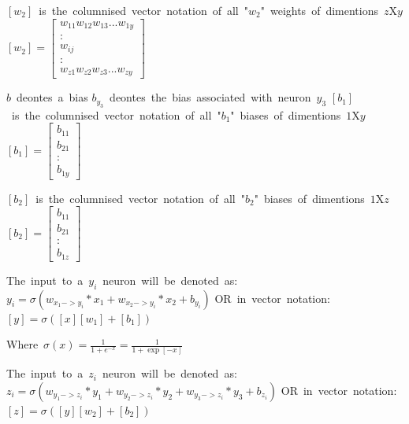 \documentclass{article}
\begin{document}
\vspace{2mm}
\hbox{$[w_2]$ is the columnised vector notation of all "$w_2$" weights of dimentions $z$X$y$}
\hbox{$[w_2] = [
    \begin{matrix}
        w_{11} w_{12} w_{13} ... w_{1y} \\
        :\\
        w_{ij}\\
        :\\
        w_{z1} w_{z2} w_{z3} ... w_{zy}
    \end{matrix}
]$}


\vspace{4mm}
\hbox{$b$ deontes a bias}
\hbox{$b_{y_3}$ deontes the bias associated with neuron $y_3$}
\hbox{$[b_1]$ is the columnised vector notation of all "$b_1$" biases of dimentions $1$X$y$ }
\hbox{$[b_1] = [
    \begin{matrix}
        b_{11}\\
        b_{21}\\
        :\\
        b_{1y}
    \end{matrix}
]$}

\vspace{2mm}
\hbox{$[b_2]$ is the columnised vector notation of all "$b_2$" biases of dimentions $1$X$z$ }
\hbox{$[b_2] = [
    \begin{matrix}
        b_{11}\\
        b_{21}\\
        :\\
        b_{1z}
    \end{matrix}
]$}

\vspace{5mm}
\hbox{The input to a $y_i$ neuron will be denoted as:}
\hbox{$y_i = \sigma(w_{x_1->y_i} * x_1 + w_{x_2->y_i} * x_2 + b_{y_i} )$}
\hbox{OR in vector notation:}
\hbox{$[y] = \sigma([x][w_1] + [b_1])$}

\vspace{2mm}
\hbox{Where $\sigma(x) = \frac{1}{1+e^{-x}} = \frac{1}{1+\exp[-x]}$}

\vspace{5mm}
\hbox{The input to a $z_i$ neuron will be denoted as:}
\hbox{$z_i = \sigma(w_{y_1->z_i}*y_1 + w_{y_2->z_i}*y_2 + w_{y_3->z_i}*y_3 + b_{z_i} )$}
\hbox{OR in vector notation:}
\hbox{$[z] = \sigma([y][w_2] + [b_2])$}
\end{document}
